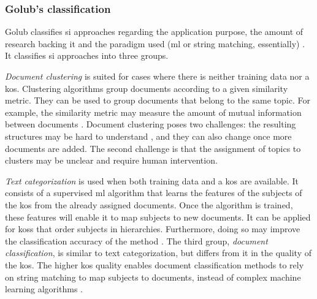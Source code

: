\subsubsection{Golub's classification} \label{subject_indexing_golub}

Golub classifies \acrshort{si} approaches regarding the application purpose, the amount of research backing it and the paradigm used (\acrlong{ml} or string matching, essentially) \cite{golub2019automatic}. It classifies \acrshort{si} approaches into three groups.

\textit{Document clustering} is suited for cases where there is neither training data nor a \acrshort{kos}. Clustering algorithms group documents according to a given similarity metric. They can be used to group documents that belong to the same topic. For example, the similarity metric may measure the amount of mutual information between documents \cite{slonim2002unsupervised}. Document clustering poses two challenges: the resulting structures may be hard to understand \cite{chen2000bringing}, and they can also change once more documents are added. The second challenge is that the assignment of topics to clusters may be unclear and require human intervention.

\textit{Text categorization} is used when both training data and a \acrfull{kos} are available. It consists of a supervised \acrshort{ml} algorithm that learns the features of the subjects of the \acrshort{kos} from the already assigned documents. Once the algorithm is trained, these features will enable it to map subjects to new documents. It can be applied for \acrshort{kos}s that order subjects in hierarchies. Furthermore, doing so may improve the classification accuracy of the method \cite{chen2000bringing}. The third group, \textit{document classification}, is similar to text categorization, but differs from it in the quality of the \acrshort{kos}. The higher \acrshort{kos} quality enables document classification methods to rely on string matching to map subjects to documents, instead of complex machine learning algorithms \cite{khoo2015augmenting}.
